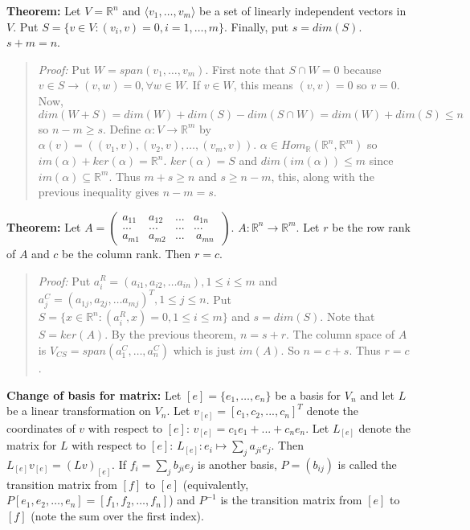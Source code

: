 {\bf Theorem:} Let $V= {\mathbb R}^n$ and $\langle v_1, \ldots, v_m \rangle$ be a set of linearly independent vectors in $V$.
Put $S= \{v \in V: (v_i, v)= 0, i = 1, \ldots, m\}$.  Finally, put $s= dim(S)$.  $s+m = n$.
\begin{quote}
\emph{Proof:}  
Put $W= span(v_1, \ldots, v_m)$.
First note that $S \cap W = 0$ because $v \in S \rightarrow (v,w)=0, \forall w \in W$.  If $v \in W$, this means $(v,v)=0$ so
$v=0$.  Now, $dim(W+S) = dim(W) + dim(S) - dim(S \cap W)= dim(W) + dim(S) \leq n$  so $n - m \geq s$.  
Define $\alpha: V \rightarrow {\mathbb R}^m$ by $\alpha(v) = ( (v_1, v), (v_2, v), \ldots, (v_m, v) )$. 
$\alpha \in Hom_{\mathbb R}({\mathbb R}^n, {\mathbb R}^m)$ so $im(\alpha) + ker(\alpha) = {\mathbb R}^n$.
$ker(\alpha) = S$ and $dim(im(\alpha)) \leq m$ since $im(\alpha) \subseteq {\mathbb R}^m$.  Thus
$m + s \geq n$ and $s \geq n-m$, this, along with the previous inequality gives $n-m=s$.
\end{quote}
{\bf Theorem:}  Let $A=
\left(
\begin{array}{cccc}
a_{11} & a_{12} & ... & a_{1n} \\
... & ... & ... & ... \\
a_{m1} &  a_{m2} & ... & \ a_{mn}\
\end{array}
\right)$.  $A: {\mathbb R}^n \rightarrow {\mathbb R}^m$.  Let $r$ be the row rank of $A$ and $c$ be the column rank. Then
$r=c$.
\begin{quote}
\emph{Proof:}  
Put $a_i^{R} = (a_{i1},  a_{i2} ,  \ldots a_{in}), 1 \leq i \leq m$ and 
$a_j^{C} = (a_{1j},  a_{2j} ,  \ldots a_{mj})^T, 1 \leq j \leq n$.
Put $S= \{x \in {\mathbb R}^n: (a_i^{R}, x)=0, 1 \leq i \leq m \}$ and $s= dim(S)$.  Note that $S=ker(A)$.  By the previous theorem,
$n= s + r$. The column space of $A$ is $V_{CS}= span(a_1^{C}, \ldots ,a_n^{C})$ which is just $im(A)$.  So
$n = c +s$.  Thus $r=c$.
\end{quote}
{\bf Change of basis for matrix:}
Let $[e]= \{ e_1 , \ldots , e_n \}$ be a basis for $V_n$ and let $L$ be a
linear transformation on $V_n$.  Let 
$v_{[e]} = [c_1 , c_2 , ... , c_n]^T$ denote the
coordinates of $v$ with respect to $[e]$: $v_{[e]}= c_1 e_1 + ...+ c_n e_n$.
Let $L_{[e]}$ denote the
matrix for $L$ with respect to $[e]$: $L_{[e]}: e_i \mapsto \sum_j a_{ji} e_j$. Then
$L_{[e]} v_{[e]} = (Lv)_{[e]}$.  If $f_i= \sum_j b_{ji} e_j$ is another basis,
$P= (b_{ij})$ is called the transition matrix from $[f]$ to $[e]$
(equivalently, $P[e_1, e_2, \ldots , e_n] = 
[f_1, f_2, \ldots , f_n]$) and $P^{-1}$ is
the transition matrix from $[e]$ to $[f]$ (note the sum over the first index).
